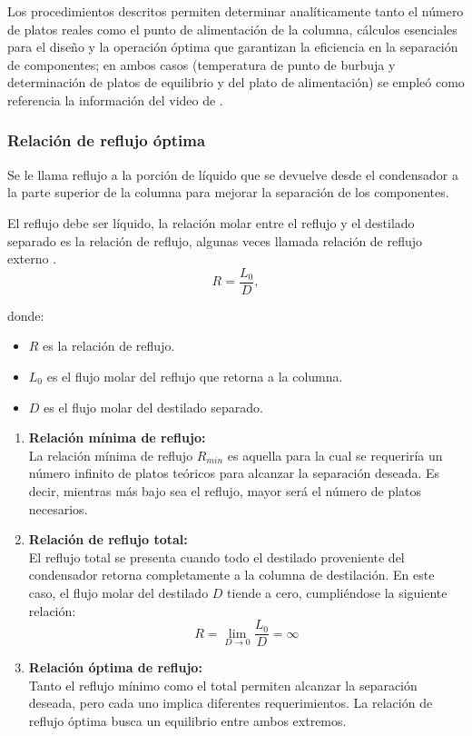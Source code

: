 Los procedimientos descritos permiten determinar analíticamente tanto el número de platos reales como el punto de alimentación de la columna, cálculos esenciales para el diseño y la operación óptima que garantizan la eficiencia en la separación de componentes; en ambos casos (temperatura de punto de burbuja y determinación de platos de equilibrio y del plato de alimentación) se empleó como referencia la información del video de \textcite{fenske_underwood_gilliland}.

\newpage
\subsubsection{Relación de reflujo óptima}
Se le llama reflujo a la porción de líquido que se devuelve desde el condensador a la parte superior de la columna para mejorar la separación de los componentes.

El reflujo debe ser líquido, la relación molar entre el reflujo y el destilado separado es la relación de reflujo, algunas veces llamada relación de reflujo externo \parencite{subsec5_5ref2}.
$$
    R = \frac{L_0}{D},
$$

donde:
\begin{itemize}
    \item $R$ es la relación de reflujo.
    \item $L_0$ es el flujo molar del reflujo que retorna a la columna.
    \item $D$ es el flujo molar del destilado separado.
\end{itemize}

\begin{enumerate}
    \item \textbf{Relación mínima de reflujo:}\\
          La relación mínima de reflujo $R_{min}$ es aquella para la cual se requeriría un número infinito de platos teóricos para alcanzar la separación deseada. Es decir, mientras más bajo sea el reflujo, mayor será el número de platos necesarios.

    \item \textbf{Relación de reflujo total:}\\
          El reflujo total se presenta cuando todo el destilado proveniente del condensador retorna completamente a la columna de destilación. En este caso, el flujo molar del destilado $D$ tiende a cero, cumpliéndose la siguiente relación:
          $$
              R = \lim_{D \rightarrow 0} \frac{L_0}{D} = \infty
          $$

    \item \textbf{Relación óptima de reflujo:}\\
          Tanto el reflujo mínimo como el total permiten alcanzar la separación deseada, pero cada uno implica diferentes requerimientos. La relación de reflujo óptima busca un equilibrio entre ambos extremos.
\end{enumerate}

